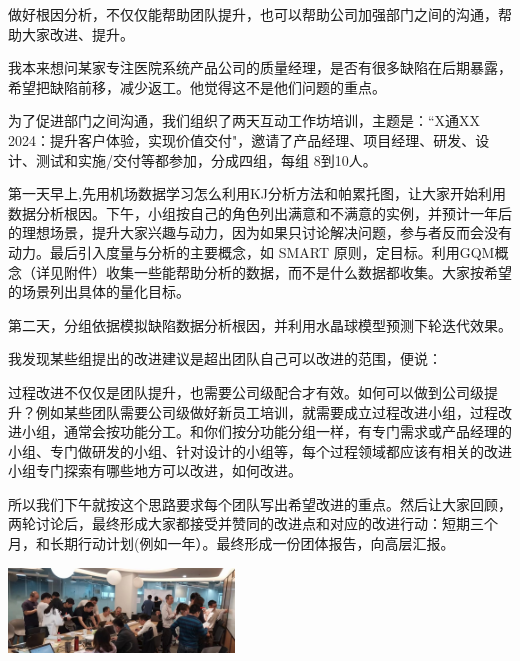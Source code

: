 做好根因分析，不仅仅能帮助团队提升，也可以帮助公司加强部门之间的沟通，帮助大家改进、提升。

我本来想问某家专注医院系统产品公司的质量经理，是否有很多缺陷在后期暴露，希望把缺陷前移，减少返工。他觉得这不是他们问题的重点。 


为了促进部门之间沟通，我们组织了两天互动工作坊培训，主题是：“X通XX 2024：提升客户体验，实现价值交付"，邀请了产品经理、项目经理、研发、设计、测试和实施/交付等都参加，分成四组，每组 8到10人。

第一天早上,先用机场数据学习怎么利用KJ分析方法和帕累托图，让大家开始利用数据分析根因。下午，小组按自己的角色列出满意和不满意的实例，并预计一年后的理想场景，提升大家兴趣与动力，因为如果只讨论解决问题，参与者反而会没有动力。最后引入度量与分析的主要概念，如 SMART 原则，定目标。利用GQM概念（详见附件）收集一些能帮助分析的数据，而不是什么数据都收集。大家按希望的场景列出具体的量化目标。

第二天，分组依据模拟缺陷数据分析根因，并利用水晶球模型预测下轮迭代效果。 


我发现某些组提出的改进建议是超出团队自己可以改进的范围，便说：

过程改进不仅仅是团队提升，也需要公司级配合才有效。如何可以做到公司级提升？例如某些团队需要公司级做好新员工培训，就需要成立过程改进小组，过程改进小组，通常会按功能分工。和你们按分功能分组一样，有专门需求或产品经理的小组、专门做研发的小组、针对设计的小组等，每个过程领域都应该有相关的改进小组专门探索有哪些地方可以改进，如何改进。 


所以我们下午就按这个思路要求每个团队写出希望改进的重点。然后让大家回顾，两轮讨论后，最终形成大家都接受并赞同的改进点和对应的改进行动：短期三个月，和长期行动计划(例如一年）。最终形成一份团体报告，向高层汇报。

\includegraphics[width=6cm]{cdWS2Screenshot_2023-10-31_144622.jpg}

